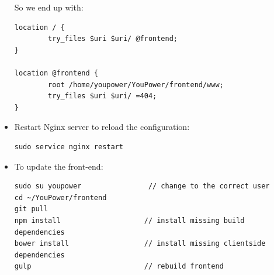 \begin{itemize}
So we end up with:

\begin{lstlisting}
location / {
        try_files $uri $uri/ @frontend;
}

location @frontend {
        root /home/youpower/YouPower/frontend/www;
        try_files $uri $uri/ =404;
}
\end{lstlisting} 

\item Restart Nginx server to reload the configuration:
\begin{lstlisting}
sudo service nginx restart
\end{lstlisting} 

\item To update the front-end:
\begin{lstlisting}
sudo su youpower                // change to the correct user
cd ~/YouPower/frontend
git pull
npm install                    // install missing build dependencies
bower install                  // install missing clientside dependencies
gulp                           // rebuild frontend
\end{lstlisting} 


\end{itemize}